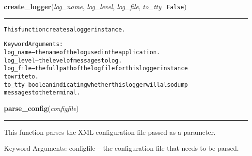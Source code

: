 \hspace{.8\funcindent}\begin{boxedminipage}{\funcwidth}

    \raggedright \textbf{create\_logger}(\textit{log\_name}, \textit{log\_level}, \textit{log\_file}, \textit{to\_tty}={\tt False})

    \vspace{-1.5ex}

    \rule{\textwidth}{0.5\fboxrule}
\setlength{\parskip}{2ex}
\begin{alltt}
This function creates a logger instance.

Keyword Arguments:
log\_name  -- the name of the log used in the application.
log\_level -- the level of messages to log.
log\_file  -- the full path of the log file for this logger instance
             to write to.
to\_tty    -- boolean indicating whether this logger will also dump
             messages to the terminal.
\end{alltt}

\setlength{\parskip}{1ex}
    \end{boxedminipage}

    \label{reliafree:utilities:parse_config}

    \vspace{0.5ex}

\hspace{.8\funcindent}\begin{boxedminipage}{\funcwidth}

    \raggedright \textbf{parse\_config}(\textit{configfile})

    \vspace{-1.5ex}

    \rule{\textwidth}{0.5\fboxrule}
\setlength{\parskip}{2ex}
    This function parses the XML configuration file passed as a parameter.

    Keyword Arguments: configfile -- the configuration file that needs to 
    be parsed.

\setlength{\parskip}{1ex}
    \end{boxedminipage}

    \label{reliafree:utilities:split_string}

    \vspace{0.5ex}

